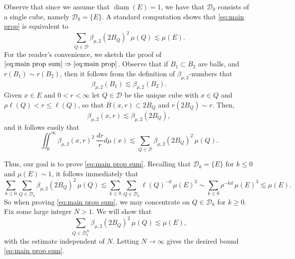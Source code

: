 \documentclass[11pt,reqno]{amsart}
\DeclareMathOperator{\diam}{diam}
\theoremstyle{definition}
\theoremstyle{remark}
\newtheorem{remark}[theorem]{Remark}
\numberwithin{equation}{section}
\newcommand{\DD}{\mathcal{D}}
\theoremstyle{theorem}
\theoremstyle{definition}
\theoremstyle{remark}
\numberwithin{equation}{section}
\begin{document}
	Observe that since we assume that $\diam(E)=1$, we have that $\DD_0$ consists of a single cube, namely $\DD_0 = \{E\}$. A standard computation shows that \eqref{eq:main prop} is equivalent to
	\begin{equation}\label{eq:main prop sum}
	\sum_{Q\in\DD}\beta_{\mu,2}(2B_Q)^2\,\mu(Q)\lesssim \mu(E).
	\end{equation}
	For the reader's convenience, we sketch the proof of $\eqref{eq:main prop sum}\Rightarrow\eqref{eq:main prop}$. Observe that if $B_1\subset B_2$ are balls, and $r(B_1)\sim r(B_2)$, then it follows from the definition of $\beta_{\mu,2}$-numbers that
	\begin{equation*}
	\beta_{\mu,2}(B_1)\lesssim\beta_{\mu,2}(B_2).
	\end{equation*}
	Given $x\in E$ and $0<r<\infty$ let $Q\in\mathcal{D}$ be the unique cube with $x\in Q$ and $\rho\ell(Q)<r\le \ell(Q)$, so that $B(x,r)\subset 2B_Q$ and $r(2B_Q)\sim r$. Then,
	\begin{equation*}
	\beta_{\mu,2}(x,r)\lesssim\beta_{\mu,2}(2B_Q),
	\end{equation*}
	and it follows easily that
	\begin{equation*}
	\iint_0^{\infty} \beta_{\mu,2}(x,r)^2\ \frac{dr}{r}d\mu(x)\lesssim \sum_{Q\in\DD}\beta_{\mu,2}(2B_Q)^2\,\mu(Q).
	\end{equation*}
	
	Thus, our goal is to prove \eqref{eq:main prop sum}. Recalling that $\mathcal{D}_k=\{E\}$ for $k\le 0$ and $\mu(E)\sim 1$, it follows immediately that
	\begin{equation*}
	\sum_{k\le 0}\sum_{Q\in\mathcal{D}_k} \beta_{\mu,2}(2B_Q)^2\,\mu(Q)\lesssim \sum_{k\le 0}\sum_{Q\in\mathcal{D}_k} \ell(Q)^{-d}\,\mu(E)^3 \sim\sum_{k\le 0} \rho^{-kd}\,\mu(E)^3\lesssim \mu(E).
	\end{equation*}
	So when proving \eqref{eq:main prop sum}, we may concentrate on $Q\in\mathcal{D}_k$ for $k\ge 0$. Fix some large integer $N>1$. We will show that
	\begin{equation}\label{eq:main prop sum2}
	\sum_{Q\in\DD_0^N}\beta_{\mu,2}(2B_Q)^2\,\mu(Q)\lesssim \mu(E),
	\end{equation}
	with the estimate independent of $N$. Letting $N\to\infty$ gives the desired bound \eqref{eq:main prop sum}. 
	
\end{document}

